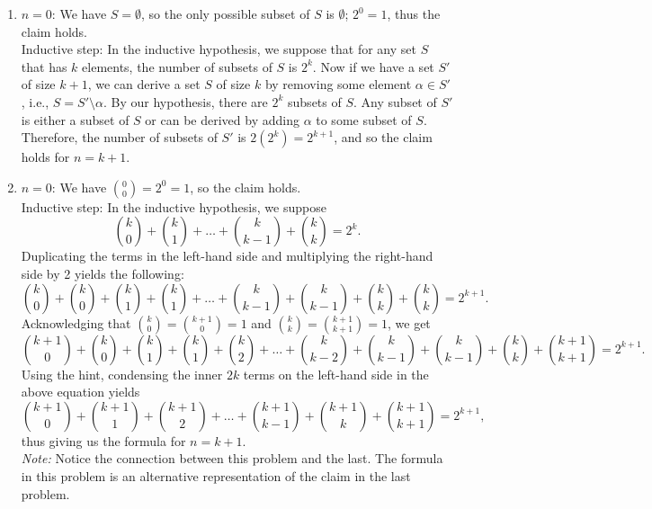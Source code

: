 \documentclass{article}
\begin{document}
\begin{enumerate}
\item $n = 0$: We have $S = \emptyset$, so the only possible subset of $S$ is $\emptyset$; $2^0 = 1$, thus the claim holds.\\
Inductive step: In the inductive hypothesis, we suppose that for any set $S$ that has $k$ elements, the number of subsets of $S$ is $2^k$. Now if we have a set $S'$ of size $k + 1$, we can derive a set $S$ of size $k$ by removing some element $\alpha \in S'$, i.e., $S = S' \setminus \alpha$. By our hypothesis, there are $2^k$ subsets of $S$. Any subset of $S'$ is either a subset of $S$ or can be derived by adding $\alpha$ to some subset of $S$. Therefore, the number of subsets of $S'$ is $2(2^k) = 2^{k + 1}$, and so the claim holds for $n = k + 1$.

\item $n = 0$: We have ${0 \choose 0} = 2^0 = 1$, so the claim holds.\\
Inductive step: In the inductive hypothesis, we suppose
\begin{equation*}
{k \choose 0} + {k \choose 1} + \ldots + {k \choose k - 1} + {k \choose k} = 2^k.
\end{equation*}
Duplicating the terms in the left-hand side and multiplying the right-hand side by 2 yields the following:
\begin{equation*}
{k \choose 0} + {k \choose 0} + {k \choose 1} + {k \choose 1} + \ldots + {k \choose k - 1} + {k \choose k - 1} + {k \choose k} + {k \choose k} = 2^{k + 1}.
\end{equation*}
Acknowledging that ${k \choose 0} = {k + 1 \choose 0} = 1$ and ${k \choose k} = {k + 1 \choose k + 1} = 1$, we get
\begin{equation*}
{k + 1 \choose 0} + {k \choose 0} + {k \choose 1} + {k \choose 1} + {k \choose 2} + \ldots + {k \choose k - 2} + {k \choose k - 1} + {k \choose k - 1} + {k \choose k} + {k + 1 \choose k + 1} = 2^{k + 1}.
\end{equation*}
Using the hint, condensing the inner $2k$ terms on the left-hand side in the above equation yields
\begin{equation*}
{k + 1 \choose 0} + {k + 1 \choose 1} + {k + 1 \choose 2} + \ldots + {k + 1 \choose k - 1} + {k + 1 \choose k} + {k + 1 \choose k + 1} = 2^{k + 1},
\end{equation*}
thus giving us the formula for $n = k + 1$.\\
\textit{Note:} Notice the connection between this problem and the last. The formula in this problem is an alternative representation of the claim in the last problem.


\end{enumerate}
\end{document}
